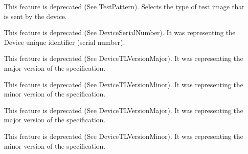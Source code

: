\begin{DoxyRefList}
\item[\label{deprecated__deprecated000042}%
\hypertarget{deprecated__deprecated000042}{}%
成员 \hyperlink{classmv_i_m_p_a_c_t_1_1acquire_1_1_gen_i_cam_1_1_image_format_control_a34aeaf5d248f18129d9c3751c6b2fa24}{mv\+I\+M\+P\+A\+C\+T\+:\+:acquire\+:\+:Gen\+I\+Cam\+:\+:Image\+Format\+Control\+:\+:test\+Image\+Selector} ]This feature is deprecated (See Test\+Pattern). Selects the type of test image that is sent by the device. 
\item[\label{deprecated__deprecated000096}%
\hypertarget{deprecated__deprecated000096}{}%
成员 \hyperlink{classmv_i_m_p_a_c_t_1_1acquire_1_1_gen_i_cam_1_1_interface_module_a44a420f9d0bf26a8d877026b3e12ea06}{mv\+I\+M\+P\+A\+C\+T\+:\+:acquire\+:\+:Gen\+I\+Cam\+:\+:Interface\+Module\+:\+:device\+I\+D} ]This feature is deprecated (See Device\+Serial\+Number). It was representing the Device unique identifier (serial number).  
\item[\label{deprecated__deprecated000097}%
\hypertarget{deprecated__deprecated000097}{}%
成员 \hyperlink{classmv_i_m_p_a_c_t_1_1acquire_1_1_gen_i_cam_1_1_interface_module_a7b2757e3dd747f119af3ad583dbf2aa8}{mv\+I\+M\+P\+A\+C\+T\+:\+:acquire\+:\+:Gen\+I\+Cam\+:\+:Interface\+Module\+:\+:gev\+Version\+Major} ]This feature is deprecated (See Device\+T\+L\+Version\+Major). It was representing the major version of the specification.  
\item[\label{deprecated__deprecated000098}%
\hypertarget{deprecated__deprecated000098}{}%
成员 \hyperlink{classmv_i_m_p_a_c_t_1_1acquire_1_1_gen_i_cam_1_1_interface_module_ac9400d7c200c444e2788da0cbc87d7ec}{mv\+I\+M\+P\+A\+C\+T\+:\+:acquire\+:\+:Gen\+I\+Cam\+:\+:Interface\+Module\+:\+:gev\+Version\+Minor} ]This feature is deprecated (See Device\+T\+L\+Version\+Minor). It was representing the minor version of the specification.  
\item[\label{deprecated__deprecated000094}%
\hypertarget{deprecated__deprecated000094}{}%
成员 \hyperlink{classmv_i_m_p_a_c_t_1_1acquire_1_1_gen_i_cam_1_1_system_module_a71bc6f8eab54b687fb89575a0af7cf9f}{mv\+I\+M\+P\+A\+C\+T\+:\+:acquire\+:\+:Gen\+I\+Cam\+:\+:System\+Module\+:\+:gev\+Version\+Major} ]This feature is deprecated (See Device\+T\+L\+Version\+Major). It was representing the major version of the specification.  
\item[\label{deprecated__deprecated000095}%
\hypertarget{deprecated__deprecated000095}{}%
成员 \hyperlink{classmv_i_m_p_a_c_t_1_1acquire_1_1_gen_i_cam_1_1_system_module_a743cf765f431c037b166db1a2f6ebe31}{mv\+I\+M\+P\+A\+C\+T\+:\+:acquire\+:\+:Gen\+I\+Cam\+:\+:System\+Module\+:\+:gev\+Version\+Minor} ]This feature is deprecated (See Device\+T\+L\+Version\+Minor). It was representing the minor version of the specification.  

\end{DoxyRefList}
